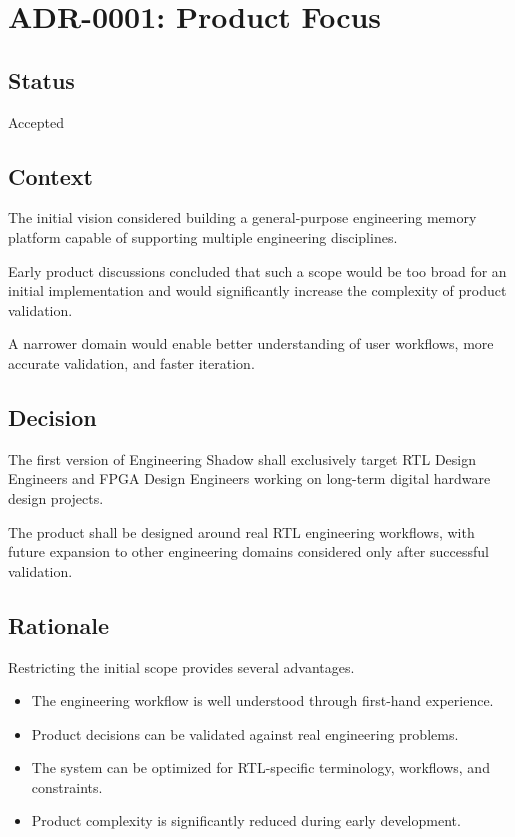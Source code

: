 \section{ADR-0001: Product Focus}

\subsection*{Status}

Accepted

\subsection*{Context}

The initial vision considered building a general-purpose engineering memory platform capable of supporting multiple engineering disciplines.

Early product discussions concluded that such a scope would be too broad for an initial implementation and would significantly increase the complexity of product validation.

A narrower domain would enable better understanding of user workflows, more accurate validation, and faster iteration.

\subsection*{Decision}

The first version of Engineering Shadow shall exclusively target RTL Design Engineers and FPGA Design Engineers working on long-term digital hardware design projects.

The product shall be designed around real RTL engineering workflows, with future expansion to other engineering domains considered only after successful validation.

\subsection*{Rationale}

Restricting the initial scope provides several advantages.

\begin{itemize}
    \item The engineering workflow is well understood through first-hand experience.
    \item Product decisions can be validated against real engineering problems.
    \item The system can be optimized for RTL-specific terminology, workflows, and constraints.
    \item Product complexity is significantly reduced during early development.
\end{itemize}

